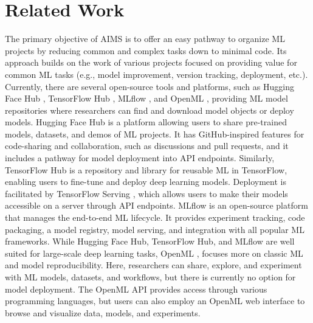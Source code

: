 \section{Related Work}
The primary objective of AIMS is to offer an easy pathway to organize ML projects by reducing common and complex tasks down to minimal code. Its approach builds on the work of various projects focused on providing value for common ML tasks (e.g., model improvement, version tracking, deployment, etc.). Currently, there are several open-source tools and platforms, such as Hugging Face Hub \citep{noauthor_hugging_2023}, TensorFlow Hub \citep{noauthor_tensorflow_2023}, MLflow \citep{noauthor_mlflow_2023, chen_developments_2020, zaharia_accelerating_2018}, and OpenML \citep{feurer_openml-python_2021, vanschoren_openml_2014, van_rijn_openml_2013}, providing ML model repositories where researchers can find and download model objects or deploy models. Hugging Face Hub \citep{noauthor_hugging_2023} is a platform allowing users to share pre-trained models, datasets, and demos of ML projects. It has GitHub-inspired features for code-sharing and collaboration, such as discussions and pull requests, and it includes a pathway for model deployment into API endpoints. Similarly, TensorFlow Hub \citep{noauthor_tensorflow_2023} is a repository and library for reusable ML in TensorFlow, enabling users to fine-tune and deploy deep learning models. Deployment is facilitated by TensorFlow Serving \citep{olston_tensorflow-serving_2017}, which allows users to make their models accessible on a server through API endpoints. MLflow \citep{chen_developments_2020, noauthor_mlflow_2023, zaharia_accelerating_2018} is an open-source platform that manages the end-to-end ML lifecycle. It provides experiment tracking, code packaging, a model registry, model serving, and integration with all popular ML frameworks. While Hugging Face Hub, TensorFlow Hub, and MLflow are well suited for large-scale deep learning tasks, OpenML \citep{feurer_openml-python_2021, vanschoren_openml_2014, van_rijn_openml_2013}, focuses more on classic ML and model reproducibility. Here, researchers can share, explore, and experiment with ML models, datasets, and workflows, but there is currently no option for model deployment. The OpenML API provides access through various programming languages, but users can also employ an OpenML web interface to browse and visualize data, models, and experiments.

